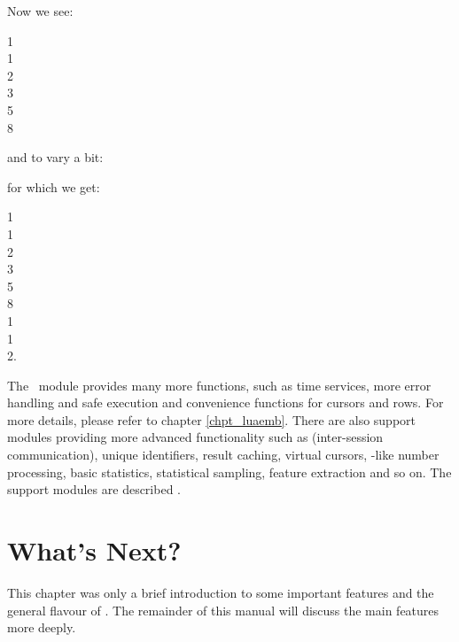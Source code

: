 \begin{minipage}{\textwidth}
Now we see:

1\\
1\\
2\\
3\\
5\\
8
\end{minipage}

and to vary a bit:


\begin{minipage}{\textwidth}
for which we get:

1\\
1\\
2\\
3\\
5\\
8\\
1\\
1\\
2.
\end{minipage}

The \nowdb\ module provides many more functions,
such as time services,
more error handling and safe execution and
convenience functions for cursors and rows. For more details,
please refer to chapter \ref{chpt_luaemb}. There are also
support modules providing more advanced functionality such as
 (inter-session communication),
unique identifiers, result caching, virtual cursors,
-like number processing,
basic statistics, statistical sampling, feature extraction
and so on. The support modules are described
.

\section{What's Next?}
This chapter was only a brief introduction
to some important features and the general flavour 
of \nowdb. The remainder of this manual will
discuss the main features more deeply.

